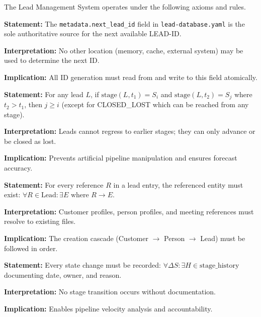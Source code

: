 The Lead Management System operates under the following axioms and rules.

\begin{tcolorbox}[colback=gray!5!white, colframe=gray!75!black,
    title=Axiom LM-A1: Single Source of Truth]
\textbf{Statement:} The \texttt{metadata.next\_lead\_id} field in \texttt{lead-database.yaml} is the sole authoritative source for the next available LEAD-ID.

\textbf{Interpretation:} No other location (memory, cache, external system) may be used to determine the next ID.

\textbf{Implication:} All ID generation must read from and write to this field atomically.
\end{tcolorbox}

\begin{tcolorbox}[colback=gray!5!white, colframe=gray!75!black,
    title=Axiom LM-A2: Forward-Only Progression]
\textbf{Statement:} For any lead $L$, if $\text{stage}(L, t_1) = S_i$ and $\text{stage}(L, t_2) = S_j$ where $t_2 > t_1$, then $j \geq i$ (except for CLOSED\_LOST which can be reached from any stage).

\textbf{Interpretation:} Leads cannot regress to earlier stages; they can only advance or be closed as lost.

\textbf{Implication:} Prevents artificial pipeline manipulation and ensures forecast accuracy.
\end{tcolorbox}

\begin{tcolorbox}[colback=gray!5!white, colframe=gray!75!black,
    title=Axiom LM-A3: Referential Integrity]
\textbf{Statement:} For every reference $R$ in a lead entry, the referenced entity must exist: $\forall R \in \text{Lead}: \exists E \text{ where } R \to E$.

\textbf{Interpretation:} Customer profiles, person profiles, and meeting references must resolve to existing files.

\textbf{Implication:} The creation cascade (Customer $\to$ Person $\to$ Lead) must be followed in order.
\end{tcolorbox}

\begin{tcolorbox}[colback=gray!5!white, colframe=gray!75!black,
    title=Axiom LM-A4: Audit Trail Completeness]
\textbf{Statement:} Every state change must be recorded: $\forall \Delta S: \exists H \in \text{stage\_history}$ documenting date, owner, and reason.

\textbf{Interpretation:} No stage transition occurs without documentation.

\textbf{Implication:} Enables pipeline velocity analysis and accountability.
\end{tcolorbox}


